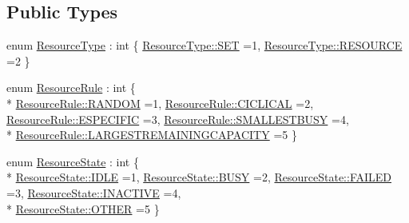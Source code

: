 \subsection*{Public Types}
\begin{DoxyCompactItemize}
\item 
enum \hyperlink{class_resource_aa607c54bf52a9c36b331888ee936a52c}{Resource\-Type} \-: int \{ \hyperlink{class_resource_aa607c54bf52a9c36b331888ee936a52ca8c52684db8f49511e9b44471716bf164}{Resource\-Type\-::\-S\-E\-T} =1, 
\hyperlink{class_resource_aa607c54bf52a9c36b331888ee936a52ca4f49da9035f276c0947466eb7c42249a}{Resource\-Type\-::\-R\-E\-S\-O\-U\-R\-C\-E} =2
 \}
\item 
enum \hyperlink{class_resource_afa28dce79d48cbaf6b10f899f2dedfb7}{Resource\-Rule} \-: int \{ \\*
\hyperlink{class_resource_afa28dce79d48cbaf6b10f899f2dedfb7a170e02e86972c2be8559884cc3c12254}{Resource\-Rule\-::\-R\-A\-N\-D\-O\-M} =1, 
\hyperlink{class_resource_afa28dce79d48cbaf6b10f899f2dedfb7a799276ee6dde6c0ae5c9fb1cacf14531}{Resource\-Rule\-::\-C\-I\-C\-L\-I\-C\-A\-L} =2, 
\hyperlink{class_resource_afa28dce79d48cbaf6b10f899f2dedfb7af3445810d590ed87cd13c95d4ed17d0a}{Resource\-Rule\-::\-E\-S\-P\-E\-C\-I\-F\-I\-C} =3, 
\hyperlink{class_resource_afa28dce79d48cbaf6b10f899f2dedfb7a3a3df6d137a401694ba70b55e6ff7305}{Resource\-Rule\-::\-S\-M\-A\-L\-L\-E\-S\-T\-B\-U\-S\-Y} =4, 
\\*
\hyperlink{class_resource_afa28dce79d48cbaf6b10f899f2dedfb7a523a069c516b904643398d8457bf5053}{Resource\-Rule\-::\-L\-A\-R\-G\-E\-S\-T\-R\-E\-M\-A\-I\-N\-I\-N\-G\-C\-A\-P\-A\-C\-I\-T\-Y} =5
 \}
\item 
enum \hyperlink{class_resource_af2224610b59962683d3cafbdac10621a}{Resource\-State} \-: int \{ \\*
\hyperlink{class_resource_af2224610b59962683d3cafbdac10621aaa5daf7f2ebbba4975d61dab1c40188c7}{Resource\-State\-::\-I\-D\-L\-E} =1, 
\hyperlink{class_resource_af2224610b59962683d3cafbdac10621aa802706a9238e2928077f97736854bad4}{Resource\-State\-::\-B\-U\-S\-Y} =2, 
\hyperlink{class_resource_af2224610b59962683d3cafbdac10621aab9e14d9b2886bcff408b85aefa780419}{Resource\-State\-::\-F\-A\-I\-L\-E\-D} =3, 
\hyperlink{class_resource_af2224610b59962683d3cafbdac10621aa6b273343c454f9c53dcfc9c4ccf171d2}{Resource\-State\-::\-I\-N\-A\-C\-T\-I\-V\-E} =4, 
\\*
\hyperlink{class_resource_af2224610b59962683d3cafbdac10621aa03570470bad94692ce93e32700d2e1cb}{Resource\-State\-::\-O\-T\-H\-E\-R} =5
 \}
\end{DoxyCompactItemize}

